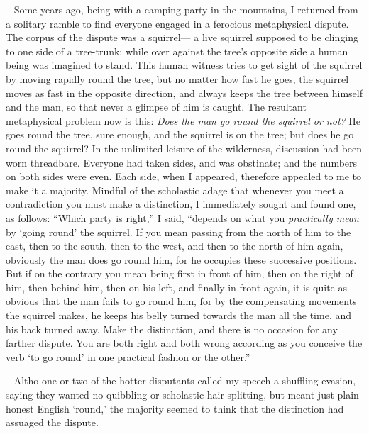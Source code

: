 \documentclass[12pt]{article}
\newcounter{wjparagraph}[section]
\newcommand*{\wjparagraph}{\stepcounter{wjparagraph}~\marginpar{\tiny\arabic{wjparagraph} }}
\begin{document}
\wjparagraph
Some years ago, being with a camping party in the mountains, I returned from a solitary ramble to find everyone engaged in a ferocious metaphysical dispute. The corpus of the dispute was a squirrel--- a live squirrel supposed to be clinging to one side of a tree-trunk; while over against the tree's opposite side a human being was imagined to stand. This human witness tries to get sight of the squirrel by moving rapidly round the tree, but no matter how fast he goes, the squirrel moves as fast in the opposite direction, and always keeps the tree between himself and the man, so that never a glimpse of him is caught. The resultant metaphysical problem now is this: \emph{Does the man go round the squirrel or not?} He goes round the tree, sure enough, and the squirrel is on the tree; but does he go round the squirrel? In the unlimited leisure of the wilderness, discussion had been worn threadbare. Everyone had taken sides, and was obstinate; and the numbers on both sides were even. Each side, when I appeared, therefore appealed to me to make it a majority. Mindful of the scholastic adage that whenever you meet a contradiction you must make a distinction, I immediately sought and found one, as follows: ``Which party is right,'' I said, ``depends on what you \emph{practically mean} by `going round' the squirrel. If you mean passing from the north of him to the east, then to the south, then to the west, and then to the north of him again, obviously the man does go round him, for he occupies these successive positions. But if on the contrary you mean being first in front of him, then on the right of him, then behind him, then on his left, and finally in front again, it is quite as obvious that the man fails to go round him, for by the compensating movements the squirrel makes, he keeps his belly turned towards the man all the time, and his back turned away. Make the distinction, and there is no occasion for any farther dispute. You are both right and both wrong according as you conceive the verb `to go round' in one practical fashion or the other.''

\wjparagraph
Altho one or two of the hotter disputants called my speech a shuffling evasion, saying they wanted no quibbling or scholastic hair-splitting, but meant just plain honest English `round,' the majority seemed to think that the distinction had assuaged the dispute.
\end{document}
